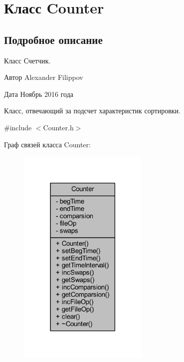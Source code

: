 \hypertarget{class_counter}{}\section{Класс Counter}
\label{class_counter}


\subsection{Подробное описание}
Класс Счетчик. 

\begin{DoxyAuthor}{Автор}
Alexander Filippov 
\end{DoxyAuthor}
\begin{DoxyDate}{Дата}
Ноябрь 2016 года
\end{DoxyDate}
Класс, отвечающий за подсчет характеристик сортировки. 

{\ttfamily \#include $<$Counter.\+h$>$}



Граф связей класса Counter\+:\nopagebreak
\begin{figure}[H]
\begin{center}
\leavevmode
\includegraphics[width=177pt]{class_counter__coll__graph}
\end{center}
\end{figure}
